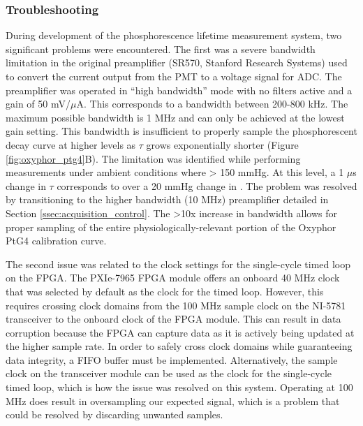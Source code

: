 \subsubsection{Troubleshooting}

During development of the phosphorescence lifetime measurement system, two significant problems were encountered. The first was a severe bandwidth limitation in the original preamplifier (SR570, Stanford Research Systems) used to convert the current output from the PMT to a voltage signal for ADC. The preamplifier was operated in “high bandwidth” mode with no filters active and a gain of 50 mV/$\mu$A. This corresponds to a bandwidth between 200-800 kHz. The maximum possible bandwidth is 1 MHz and can only be achieved at the lowest gain setting. This bandwidth is insufficient to properly sample the phosphorescent decay curve at higher  levels as $\tau$ grows exponentially shorter (Figure \ref{fig:oxyphor_ptg4}B). The limitation was identified while performing measurements under ambient conditions where  \textgreater{} 150 mmHg. At this  level, a 1 $\mu$s change in $\tau$ corresponds to over a 20 mmHg change in . The problem was resolved by transitioning to the higher bandwidth (10 MHz) preamplifier detailed in Section \ref{ssec:acquisition_control}. The \textgreater 10x increase in bandwidth allows for proper sampling of the entire physiologically-relevant portion of the Oxyphor PtG4 calibration curve.

The second issue was related to the clock settings for the single-cycle timed loop on the FPGA. The PXIe-7965 FPGA module offers an onboard 40 MHz clock that was selected by default as the clock for the timed loop. However, this requires crossing clock domains from the 100 MHz sample clock on the NI-5781 transceiver to the onboard clock of the FPGA module. This can result in data corruption because the FPGA can capture data as it is actively being updated at the higher sample rate. In order to safely cross clock domains while guaranteeing data integrity, a FIFO buffer must be implemented. Alternatively, the sample clock on the transceiver module can be used as the clock for the single-cycle timed loop, which is how the issue was resolved on this system. Operating at 100 MHz does result in oversampling our expected signal, which is a problem that could be resolved by discarding unwanted samples.

